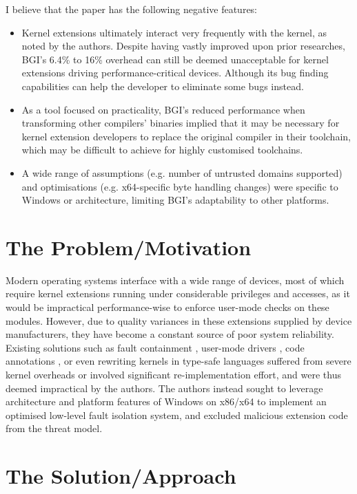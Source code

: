 \documentclass[11pt]{article}
\begin{document}
I believe that the paper has the following negative features:
\begin{itemize}
	\item Kernel extensions ultimately interact very frequently with the kernel, as noted by the authors. Despite having vastly improved upon prior researches, BGI's 6.4\% to 16\% overhead can still be deemed unacceptable for kernel extensions driving performance-critical devices. Although its bug finding capabilities can help the developer to eliminate some bugs instead.
	\item As a tool focused on practicality, BGI's reduced performance when transforming other compilers' binaries implied that it may be necessary for kernel extension developers to replace the original compiler in their toolchain, which may be difficult to achieve for highly customised toolchains. 
	\item A wide range of assumptions (e.g. number of untrusted domains supported) and optimisations (e.g. x64-specific byte handling changes) were specific to Windows or architecture, limiting BGI's adaptability to other platforms. 
\end{itemize}

\section*{The Problem/Motivation}

Modern operating systems interface with a wide range of devices, most of which require kernel extensions running under considerable privileges and accesses, as it would be impractical performance-wise to enforce user-mode checks on these modules. However, due to quality variances in these extensions supplied by device manufacturers, they have become a constant source of poor system reliability. Existing solutions such as fault containment \cite{erlingsson2006xfi}, user-mode drivers \cite{forin1991system}, code annotations \cite{ganapathy2008design}, or even rewriting kernels in type-safe languages \cite{necula2002ccured} suffered from severe kernel overheads or involved significant re-implementation effort, and were thus deemed impractical by the authors. The authors instead sought to leverage architecture and platform features of Windows on x86/x64 to implement an optimised low-level fault isolation system, and excluded malicious extension code \cite{wahbe1994efficient} from the threat model.

\section*{The Solution/Approach}
\end{document}
